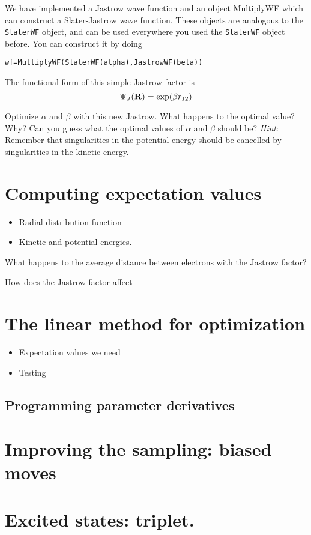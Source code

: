 \documentclass[12pt]{article}
\newcommand{\bR}{{\bf R}}
\begin{document}
We have implemented a Jastrow wave function and an object MultiplyWF which can construct a Slater-Jastrow wave function.
These objects are analogous to the \verb|SlaterWF| object, and can be used everywhere you used the \verb|SlaterWF| object before.
You can construct it by doing
\begin{verbatim}
wf=MultiplyWF(SlaterWF(alpha),JastrowWF(beta))	
\end{verbatim}
The functional form of this simple Jastrow factor is 
\begin{equation}
\Psi_J(\bR) = \exp(\beta r_{12})	
\end{equation}

Optimize $\alpha$ and $\beta$ with this new Jastrow. What happens to the optimal value? Why? 
Can you guess what the optimal values of $\alpha$ and $\beta$ should be? 
\textit{Hint}: Remember that singularities in the potential energy should be cancelled by singularities in the kinetic energy. 

\section{Computing expectation values}

\begin{itemize}
\item Radial distribution function	
\item Kinetic and potential energies. 
\end{itemize}

What happens to the average distance between electrons with the Jastrow factor? 

How does the Jastrow factor affect 

\section{The linear method for optimization} 

\begin{itemize}
\item Expectation values we need
\item Testing 
\end{itemize}

\subsection{Programming parameter derivatives}


\section{Improving the sampling: biased moves} 

\section{Excited states: triplet. } 
\end{document}
